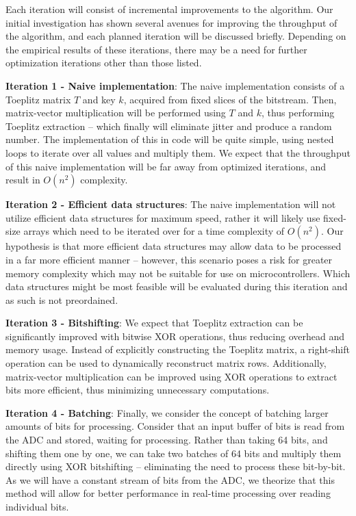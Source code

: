 \documentclass{sigchi}
\begin{document}
Each iteration will consist of incremental improvements to the algorithm. Our initial investigation has shown several avenues for improving the throughput of the algorithm, and each planned iteration will be discussed briefly. Depending on the empirical results of these iterations, there may be a need for further optimization iterations other than those listed.

\textbf{Iteration 1 - Naive implementation}: The naive implementation consists of a Toeplitz matrix \(T\) and key \(k\), acquired from fixed slices of the bitstream. Then, matrix-vector multiplication will be performed using \(T\) and \(k\), thus performing Toeplitz extraction -- which finally will eliminate jitter and produce a random number. The implementation of this in code will be quite simple, using nested loops to iterate over all values and multiply them. We expect that the throughput of this naive implementation will be far away from optimized iterations, and result in \(O(n^2)\) complexity.

\textbf{Iteration 2 - Efficient data structures}: The naive implementation will not utilize efficient data structures for maximum speed, rather it will likely use fixed-size arrays which need to be iterated over for a time complexity of \(O(n^2)\). Our hypothesis is that more efficient data structures may allow data to be processed in a far more efficient manner -- however, this scenario poses a risk for greater memory complexity which may not be suitable for use on microcontrollers. Which data structures might be most feasible will be evaluated during this iteration and as such is not preordained.

\textbf{Iteration 3 - Bitshifting}: We expect that Toeplitz extraction can be significantly improved with bitwise XOR operations, thus reducing overhead and memory usage. Instead of explicitly constructing the Toeplitz matrix, a right-shift operation can be used to dynamically reconstruct matrix rows. Additionally, matrix-vector multiplication can be improved using XOR operations to extract bits more efficient, thus minimizing unnecessary computations.

\textbf{Iteration 4 - Batching}: Finally, we consider the concept of batching larger amounts of bits for processing. Consider that an input buffer of bits is read from the ADC and stored, waiting for processing. Rather than taking 64 bits, and shifting them one by one, we can take two batches of 64 bits and multiply them directly using XOR bitshifting -- eliminating the need to process these bit-by-bit. As we will have a constant stream of bits from the ADC, we theorize that this method will allow for better performance in real-time processing over reading individual bits.
\end{document}
